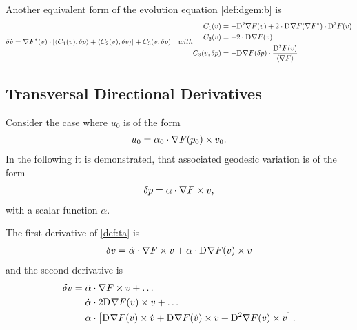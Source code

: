 Another equivalent form of the evolution equation \eqref{def:dgem:b} is
\begin{subequations}
    \begin{align}
        \delta \dot{ v }   &=
        \darg{F}( v ) \mult
        [   \skap{ C_1( v ) }{ \delta p }  + 
            \skap{ C_2( v ) }{ \delta v }     ]  +
        C_3( v, \delta p )
    \end{align}
    with
    \begin{align}
        C_1( v )  &=
        -\diff{2}{\grad{F}}( v )  +
        2 \mult \diff{}{\grad{F}}( \darg{F} ) \mult \diff{2}{F}( v )  \\
        C_2( v )  &=
        -2 \mult \diff{}{\grad{F}}( v )  \\
        C_3( v, \delta p )  &=
        - \diff{}{\grad{F}}( \delta p ) \mult \frac{ \diff{2}{F}(v ) }{ \skaq{ \grad{F} } }
    \end{align}
\end{subequations}


\subsection{Transversal Directional Derivatives}



Consider the case where $ u_0 $ is of the form
\begin{align}
    u_0  =  \alpha_0 \cdot \nabla F( p_0 ) \times v_0 .
\end{align}
In the following it is demonstrated,
that associated geodesic variation is of the form
\begin{align}
    \delta p  =  \alpha \cdot \nabla F  \times v ,
    \label{def:ta}
\end{align}
with a scalar function $ \alpha $.



The first derivative of \eqref{def:ta} is
\begin{align}
    \delta v  =
    \dot{ \alpha } \cdot \nabla F  \times v  +
    \alpha \cdot \mathrm{D}^{  } \nabla F  ( v ) \times v
    \label{eq:tad}
\end{align}
and the second derivative is
\begin{align}
    \delta \dot{ v }  &=
    \ddot{ \alpha } \mult \grad{ F } \times v  +  \dots\nonumber\\
    &\hphantom{{}={}}\dot{ \alpha } \mult 2 \diff{}{ \grad{ F } }( v ) \times v  +  \dots\nonumber\\
    &\hphantom{{}={}}\alpha \mult \left[ \diff{}{ \grad{ F } }( v ) \times \dot{ v }  +
    \diff{}{ \grad{ F } }( \dot{ v } ) \times v  +  
    \diff{ 2 }{ \grad{ F } }( v ) \times v \right] .
    \label{eq:tadd}
\end{align}


